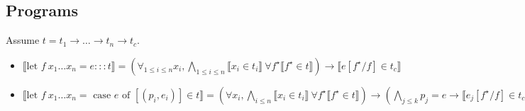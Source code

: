 \documentclass{article}
\begin{document}
\thispagestyle{empty}

\subsection{Programs}
Assume $t = t_1 \to \dots \to t_n \to t_c$.

\begin{itemize}
\item $\llbracket \mbox{let } f~x_1 \dots x_n = e ::: t \rrbracket = (\forall_{1 \leq i \leq n} x_i, \bigwedge_{1 \leq i \leq n} \llbracket x_i \in t_i \rrbracket~\forall f^\star \llbracket f^\star \in t \rrbracket) \to \llbracket e[f^\star/f] \in t_c \rrbracket$
\item $\llbracket \mbox{let } f~x_1 \dots x_n = \mbox{ case } e \mbox{ of } [(p_i,e_i)] \in t \rrbracket = (\forall x_i, \bigwedge_{i \leq n} \llbracket x_i \in t_i \rrbracket~\forall f^\star \llbracket f^\star \in t \rrbracket) \to (\bigwedge_{j \leq k} p_j = e \to \llbracket e_j[f^\star/f] \in t_c \rrbracket)$
\end{itemize}

\thispagestyle{empty}
\end{document}
